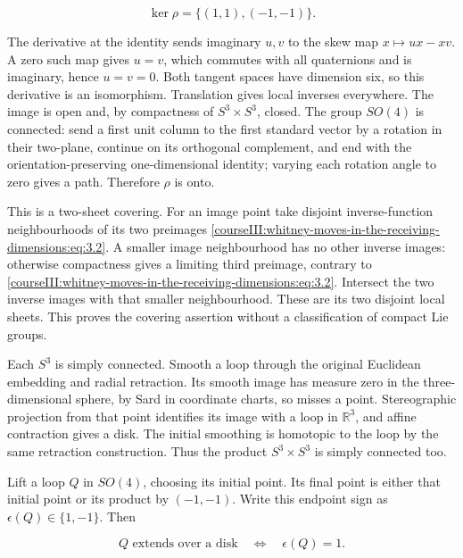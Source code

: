 \begin{equation}
\ker\rho=\{(1,1),(-1,-1)\}.
 \label{courseIII:whitney-moves-in-the-receiving-dimensions:eq:3.2}
\end{equation}

The derivative at the identity sends imaginary \(u,v\) to the skew map \(x\mapsto ux-xv\). A zero such map gives \(u=v\), which commutes with all quaternions and is imaginary, hence \(u=v=0\). Both tangent spaces have dimension six, so this derivative is an isomorphism. Translation gives local inverses everywhere. The image is open and, by compactness of \(S^3\times S^3\), closed. The group \(SO(4)\) is connected: send a first unit column to the first standard vector by a rotation in their two-plane, continue on its orthogonal complement, and end with the orientation-preserving one-dimensional identity; varying each rotation angle to zero gives a path. Therefore \(\rho\) is onto.

This is a two-sheet covering. For an image point take disjoint inverse-function neighbourhoods of its two preimages \eqref{courseIII:whitney-moves-in-the-receiving-dimensions:eq:3.2}. A smaller image neighbourhood has no other inverse images: otherwise compactness gives a limiting third preimage, contrary to \eqref{courseIII:whitney-moves-in-the-receiving-dimensions:eq:3.2}. Intersect the two inverse images with that smaller neighbourhood. These are its two disjoint local sheets. This proves the covering assertion without a classification of compact Lie groups.

Each \(S^3\) is simply connected. Smooth a loop through the original Euclidean embedding and radial retraction. Its smooth image has measure zero in the three-dimensional sphere, by Sard in coordinate charts, so misses a point. Stereographic projection from that point identifies its image with a loop in \(\mathbb R^3\), and affine contraction gives a disk. The initial smoothing is homotopic to the loop by the same retraction construction. Thus the product \(S^3\times S^3\) is simply connected too.

Lift a loop \(Q\) in \(SO(4)\), choosing its initial point. Its final point is either that initial point or its product by \((-1,-1)\). Write this endpoint sign as \(\epsilon(Q)\in\{1,-1\}\). Then

\begin{equation}
Q\text{ extends over a disk}\quad\Longleftrightarrow\quad
 \epsilon(Q)=1.
 \label{courseIII:whitney-moves-in-the-receiving-dimensions:eq:3.3}
\end{equation}

